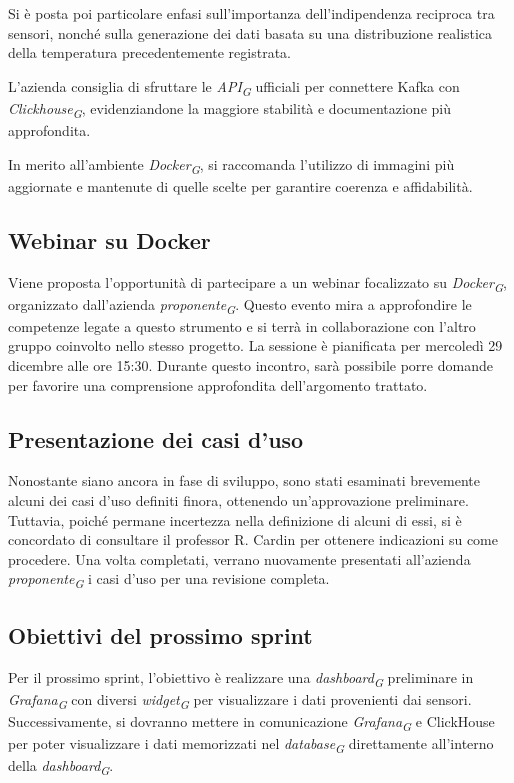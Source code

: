 \documentclass{article}
\begin{document}
Si è posta poi particolare enfasi sull'importanza dell'indipendenza reciproca tra sensori, nonché sulla generazione dei dati basata su una distribuzione realistica della temperatura precedentemente registrata.  

L'azienda consiglia di sfruttare le \textit{API}\textsubscript{\textit{G}} ufficiali per connettere Kafka con \textit{Clickhouse}\textsubscript{\textit{G}}, evidenziandone la maggiore stabilità e documentazione più approfondita.  

In merito all'ambiente \textit{Docker}\textsubscript{\textit{G}}, si raccomanda l'utilizzo di immagini più aggiornate e mantenute di quelle scelte per garantire coerenza e affidabilità.  

\subsection{Webinar su Docker}
Viene proposta l'opportunità di partecipare a un webinar focalizzato su \textit{Docker}\textsubscript{\textit{G}}, organizzato dall'azienda \textit{proponente}\textsubscript{\textit{G}}. Questo evento mira a approfondire le competenze legate a questo strumento e si terrà in collaborazione con l'altro gruppo coinvolto nello stesso progetto.  
La sessione è pianificata per mercoledì 29 dicembre alle ore 15:30. Durante questo incontro, sarà possibile porre domande per favorire una comprensione approfondita dell'argomento trattato. 

\subsection{Presentazione dei casi d'uso}
Nonostante siano ancora in fase di sviluppo, sono stati esaminati brevemente alcuni dei casi d'uso definiti finora, ottenendo un'approvazione preliminare.
Tuttavia, poiché permane incertezza nella definizione di alcuni di essi, si è concordato di consultare il professor R. Cardin per ottenere indicazioni su come procedere.  
Una volta completati, verrano nuovamente presentati all'azienda \textit{proponente}\textsubscript{\textit{G}} i casi d'uso per una revisione completa.  

\subsection{Obiettivi del prossimo sprint}
Per il prossimo sprint, l'obiettivo è realizzare una \textit{dashboard}\textsubscript{\textit{G}} preliminare in \textit{Grafana}\textsubscript{\textit{G}} con diversi \textit{widget}\textsubscript{\textit{G}} per visualizzare i dati provenienti dai sensori. Successivamente, si dovranno mettere in comunicazione \textit{Grafana}\textsubscript{\textit{G}} e ClickHouse per poter visualizzare i dati memorizzati nel \textit{database}\textsubscript{\textit{G}} direttamente all'interno della \textit{dashboard}\textsubscript{\textit{G}}.  
\end{document}
